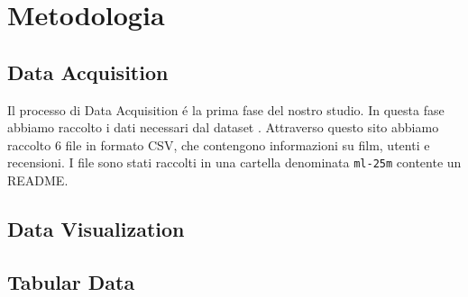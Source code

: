 \documentclass[../../Report.tex]{subfiles}
\begin{document}
\chapter{Metodologia}

\section{Data Acquisition}
Il processo di Data Acquisition é la prima fase del nostro studio.
In questa fase abbiamo raccolto i dati necessari dal dataset \cite[MovieLens]{MovieLens}.
Attraverso questo sito abbiamo raccolto 6 file in formato CSV, che contengono informazioni su film, utenti e recensioni.
I file sono stati raccolti in una cartella denominata \texttt{ml-25m} contente un README.

\section{Data Visualization}

\section{Tabular Data}
\end{document}
